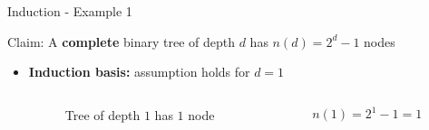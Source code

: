 \begin{frame}{Induction - Example 1}
  \begin{block}{Claim:}
    A \textbf{complete} binary tree of depth $d$ has $n(d) = 2^d - 1$ nodes
  \end{block}
  \begin{itemize}
    \item<2- |handout:1>
      \textbf{Induction basis:} assumption holds for {\color{MainA}$d = 1$}
      \begin{columns}
        \begin{column}{0.5\linewidth}
          \begin{figure}[!h]
            \begin{adjustbox}{width=4em}
              
            \end{adjustbox}
            \caption{Tree of depth {\color{MainA}$1$} has
              {\color{MainA}$1$} node}
          \end{figure}
        \end{column}
        \begin{column}{0.5\linewidth}
          {\color{MainA}$n(1) = 2^1 - 1 = 1$}\\
        \end{column}
      \end{columns}
  \end{itemize}
\end{frame}


